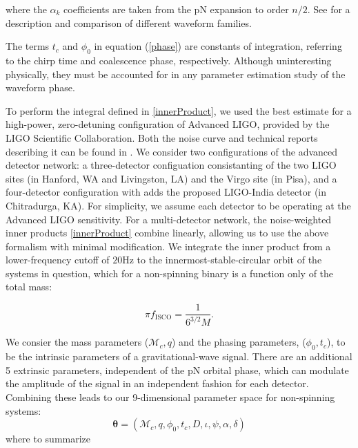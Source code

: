 \documentclass[11pt,a4paper]{emulateapj}
\begin{document}
\noindent where the $\alpha_{k}$ coefficients are taken from the pN expansion to order $n/2$.  See \cite{BuonannoWaveform} for a description and comparison of different waveform families.

The terms $t_c$ and $\phi_0$ in equation (\ref{phase}) are constants
of integration, referring to the chirp time and coalescence phase,
respectively.  Although uninteresting physically, they must be
accounted for in any parameter estimation study of the waveform phase.

To perform the integral defined in \eqref{innerProduct}, we used the best estimate
for a high-power, zero-detuning configuration of Advanced LIGO, provided by the LIGO Scientific Collaboration.
Both the noise curve and technical reports describing it can be found in \cite{ADVLIGONoise}.
We consider two configurations of the advanced detector
network: a three-detector configuation consistanting of the two LIGO sites 
(in Hanford, WA and Livingston, LA) and the Virgo site (in Pisa), and a four-detector
configuration with adds the proposed LIGO-India detector (in Chitradurga, KA).
For simplicity, we assume each detector to be operating at the Advanced LIGO sensitivity. 
For a multi-detector network, the noise-weighted inner products
\eqref{innerProduct} combine linearly, allowing us to use the above
formalism with minimal modification.  We integrate the inner product
from a lower-frequency cutoff of $20\text{Hz}$ to the
innermost-stable-circular orbit of the systems in question, which for a
non-spinning binary is a function only of the total mass:

\begin{equation}
  \pi f_{\text{ISCO}} = \frac{1}{6^{3/2}M}.
  \label{ISCOFrequency}
\end{equation}
   
We consier the mass parameters ($\mathcal{M}_c,q$) and the phasing parameters,
($\phi_0,t_c$), to be the intrinsic parameters of a gravitational-wave signal.  There 
are an additional 5 extrinsic parameters, independent of the pN orbital phase, which can
modulate the amplitude of the signal in an independent fashion for each detector.  
Combining these leads to our 9-dimensional parameter space for non-spinning systems:
\begin{equation}
\boldsymbol{\theta} =  (\mathcal{M}_c, q, \phi_0,t_c,D,\iota,\psi,\alpha,\delta)
\label{parameterspace}
\end{equation}
where to summarize
\end{document}

